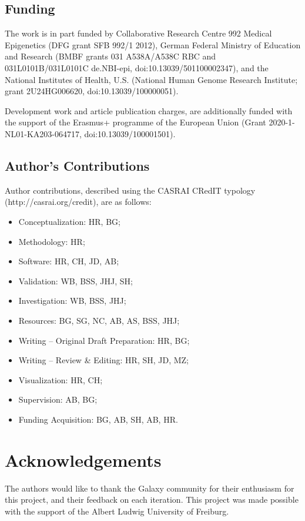 \documentclass[a4paper,num-refs]{oup-contemporary}
\begin{document}
\subsection{Funding}
The work is in part funded by Collaborative Research Centre 992 Medical Epigenetics (DFG grant SFB 992/1 2012), German Federal Ministry of Education and Research (BMBF grants 031 A538A/A538C RBC and 031L0101B/031L0101C de.NBI-epi, doi:10.13039/501100002347), and the National Institutes of Health, U.S. (National Human Genome Research Institute; grant 2U24HG006620, doi:10.13039/100000051).

Development work and article publication charges, are additionally funded with the support of the Erasmus+ programme of the European Union (Grant 2020-1-NL01-KA203-064717, doi:10.13039/100001501).

\subsection{Author's Contributions}
Author contributions, described using the CASRAI CRedIT typology (http://casrai.org/credit), are as follows:

\begin{itemize}
    \item Conceptualization: HR, BG;
    \item Methodology: HR;
    \item Software: HR, CH, JD, AB;
    \item Validation: WB, BSS, JHJ, SH;
    \item Investigation: WB, BSS, JHJ;
    \item Resources: BG, SG, NC, AB, AS, BSS, JHJ;
    \item Writing – Original Draft Preparation: HR, BG;
    \item Writing – Review & Editing: HR, SH, JD, MZ;
    \item Visualization: HR, CH;
    \item Supervision: AB, BG;
    \item Funding Acquisition: BG, AB, SH, AB, HR.
\end{itemize}

\section{Acknowledgements}
The authors would like to thank the Galaxy community for their enthusiasm for this project, and their feedback on each iteration.
This project was made possible with the support of the Albert Ludwig University of Freiburg.


\end{document}
